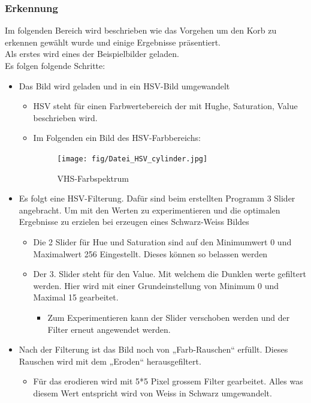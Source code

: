\subsubsection{Erkennung}
Im folgenden Bereich wird beschrieben wie das Vorgehen um den Korb zu erkennen gewählt wurde und einige Ergebnisse präsentiert.\\
%
Als erstes wird eines der Beispielbilder geladen.\\
%
Es folgen folgende Schritte:\\
%
\begin{itemize}
	\item Das Bild wird geladen und in ein HSV-Bild umgewandelt
	\begin{itemize}
		\item HSV steht für einen Farbwertebereich der mit Hughe, Saturation, Value beschrieben wird.
		\item Im Folgenden ein Bild des HSV-Farbbereichs:\\
		\begin{figure}[h!]
			\centering
			\texttt{[image: fig/Datei\_HSV\_cylinder.jpg]}
			\caption{VHS-Farbspektrum}
			\label{fig:HSV-Farbspektrum}
		\end{figure}
	\end{itemize}
	\item Es folgt eine HSV-Filterung. Dafür sind beim erstellten Programm 3 Slider angebracht. Um mit den Werten zu experimentieren und die optimalen Ergebnisse zu erzielen bei erzeugen eines Schwarz-Weiss Bildes
	\begin{itemize}
		\item Die 2 Slider für Hue und Saturation sind auf den Minimumwert 0 und Maximalwert 256 Eingestellt. Dieses können so belassen werden
		\item Der 3. Slider steht für den Value. Mit welchem die Dunklen werte gefiltert werden. Hier wird mit einer Grundeinstellung von Minimum 0 und Maximal 15 gearbeitet.
		\begin{itemize}
			\item Zum Experimentieren kann der Slider verschoben werden und der Filter erneut angewendet werden.
		\end{itemize}
	\end{itemize}
	\item Nach der Filterung ist das Bild noch von „Farb-Rauschen“ erfüllt. Dieses Rauschen wird mit dem „Eroden“ herausgefiltert.
	\begin{itemize}
		\item Für das erodieren wird mit 5*5 Pixel grossem Filter gearbeitet. Alles was diesem Wert entspricht wird von Weiss in Schwarz umgewandelt.

\end{itemize}
\end{itemize}
